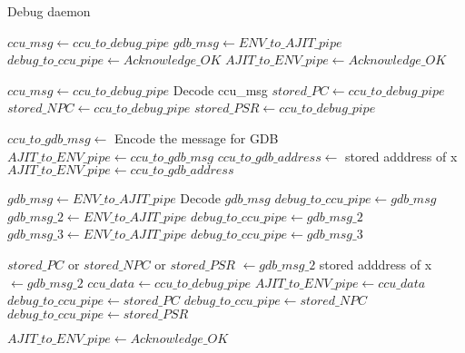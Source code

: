 \documentclass[a4paper, 11pt]{article}
\begin{document}
\begin{algorithm}
\caption{Debug daemon}\label{debugger}
\begin{algorithmic}[1]
	\State $ccu\_msg\gets ccu\_to\_debug\_pipe$	
	\EndWhile\label{dummy}
	\State $gdb\_msg\gets ENV\_to\_AJIT\_pipe$	
	\EndWhile\label{dummy}
	\State $debug\_to\_ccu\_pipe \gets Acknowledge\_OK$
	\State $AJIT\_to\_ENV\_pipe \gets Acknowledge\_OK$
	
	\State $ccu\_msg \gets ccu\_to\_debug\_pipe$
		\State Decode ccu\_msg
			\State $stored\_PC\gets ccu\_to\_debug\_pipe$	
			\State $stored\_NPC\gets ccu\_to\_debug\_pipe$
			\State $stored\_PSR\gets ccu\_to\_debug\_pipe$
			
		\EndIf
		\State $ccu\_to\_gdb\_msg\gets $ Encode the message for GDB
		\State $AJIT\_to\_ENV\_pipe \gets ccu\_to\_gdb\_msg$
			\State $ccu\_to\_gdb\_address\gets $ stored adddress of x
			\State $AJIT\_to\_ENV\_pipe \gets ccu\_to\_gdb\_address$
		\EndIf
	\EndIf
	
	\State $gdb\_msg \gets ENV\_to\_AJIT\_pipe$	
		\State Decode $gdb\_msg$
		\State $debug\_to\_ccu\_pipe \gets gdb\_msg$
			\State $gdb\_msg\_2 \gets ENV\_to\_AJIT\_pipe$	
			\State $debug\_to\_ccu\_pipe \gets  gdb\_msg\_2$
		\EndIf
			\State $gdb\_msg\_3 \gets ENV\_to\_AJIT\_pipe$	
			\State $debug\_to\_ccu\_pipe \gets  gdb\_msg\_3$
		\EndIf
		
			\State $stored\_PC$ or $stored\_NPC$ or $stored\_PSR$ $\gets gdb\_msg\_2$
			\State stored adddress of x $\gets gdb\_msg\_2$
			\State $ccu\_data \gets ccu\_to\_debug\_pipe$
			\State $AJIT\_to\_ENV\_pipe \gets ccu\_data$
			\State $debug\_to\_ccu\_pipe \gets stored\_PC$
			\State $debug\_to\_ccu\_pipe \gets stored\_NPC$
			\State $debug\_to\_ccu\_pipe \gets stored\_PSR$
		\EndIf
		
			\State $AJIT\_to\_ENV\_pipe \gets Acknowledge\_OK$
		\EndIf
	\EndIf
	
	\EndFunction
\end{algorithmic}
\end{algorithm}
\end{document}
